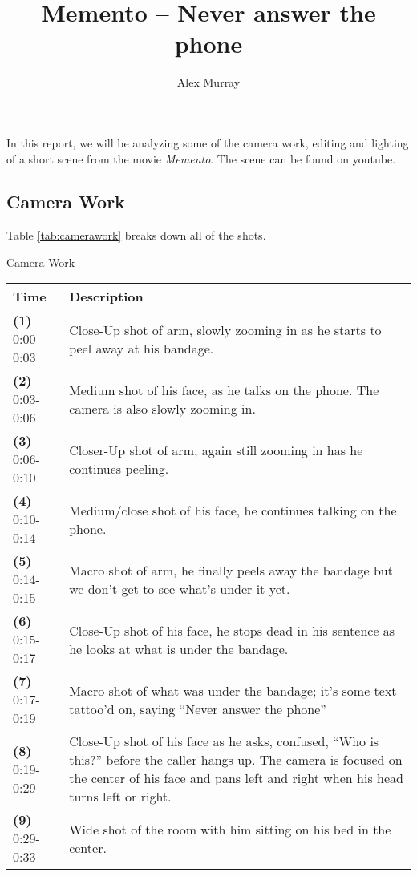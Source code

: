 \documentclass[notitlepage]{fhnwreport}
\title{Memento -- Never answer the phone}
\author{Alex Murray}
\begin{document}
\maketitle

In this report, we  will  be  analyzing  some  of the camera work, editing and
lighting of a short scene  from  the  movie \textit{Memento}. The scene can be
found on youtube\cite{ref:scene}.

\subsection*{Camera Work}

Table \ref{tab:camerawork} breaks down all of the shots.

\begin{center}
\begin{threeparttable}
    \caption{Camera Work}
    \label{tab:camerawork}
    \begin{tabular}{p{3cm}p{11.2cm}}
        \toprule
        \textbf{Time} & \textbf{Description} \\
        \midrule
        \textbf{(1)} 0:00-0:03 & Close-Up shot of arm, slowly zooming in as he starts to peel away at his bandage. \\
        \textbf{(2)} 0:03-0:06 & Medium shot of his face, as he talks on the phone. The camera is also slowly zooming in. \\
        \textbf{(3)} 0:06-0:10 & Closer-Up shot of arm, again still zooming in has he continues peeling. \\
        \textbf{(4)} 0:10-0:14 & Medium/close shot of his face, he continues talking on the phone. \\
        \textbf{(5)} 0:14-0:15 & Macro shot of arm, he finally peels away the bandage but we don't get to see what's under it yet. \\
        \textbf{(6)} 0:15-0:17 & Close-Up shot of his face, he stops dead in his sentence as he looks at what is under the bandage. \\
        \textbf{(7)} 0:17-0:19 & Macro shot of what was under the bandage; it's some text tattoo'd on, saying ``Never answer the phone'' \\
        \textbf{(8)} 0:19-0:29 & Close-Up shot of his face as he asks, confused, ``Who is this?'' before the caller hangs up. The camera is focused on the center of his face and pans left and right when his head turns left or right. \\
        \textbf{(9)} 0:29-0:33 & Wide shot of the room with him sitting on his bed in the center. \\
        \bottomrule
    \end{tabular}
\end{threeparttable}
\end{center}
\end{document}
